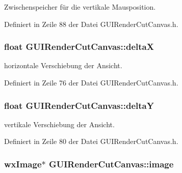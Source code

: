 Zwischenspeicher für die vertikale Mausposition. 



Definiert in Zeile 88 der Datei G\-U\-I\-Render\-Cut\-Canvas.\-h.

\hypertarget{classGUIRenderCutCanvas_a28357900ca23a3d3519af015ed6333ba}{
\subsubsection[{delta\-X}]{\setlength{\rightskip}{0pt plus 5cm}float G\-U\-I\-Render\-Cut\-Canvas\-::delta\-X\hspace{0.3cm}{\ttfamily [private]}}}\label{classGUIRenderCutCanvas_a28357900ca23a3d3519af015ed6333ba}


horizontale Verschiebung der Ansicht. 



Definiert in Zeile 76 der Datei G\-U\-I\-Render\-Cut\-Canvas.\-h.

\hypertarget{classGUIRenderCutCanvas_a17b630c38009368a99e37b9f0eab3deb}{
\subsubsection[{delta\-Y}]{\setlength{\rightskip}{0pt plus 5cm}float G\-U\-I\-Render\-Cut\-Canvas\-::delta\-Y\hspace{0.3cm}{\ttfamily [private]}}}\label{classGUIRenderCutCanvas_a17b630c38009368a99e37b9f0eab3deb}


vertikale Verschiebung der Ansicht. 



Definiert in Zeile 80 der Datei G\-U\-I\-Render\-Cut\-Canvas.\-h.

\hypertarget{classGUIRenderCutCanvas_a11ac45e65920dedf0cfbba21865dc2f9}{
\subsubsection[{image}]{\setlength{\rightskip}{0pt plus 5cm}wx\-Image$\ast$ G\-U\-I\-Render\-Cut\-Canvas\-::image\hspace{0.3cm}{\ttfamily [private]}}}\label{classGUIRenderCutCanvas_a11ac45e65920dedf0cfbba21865dc2f9}


